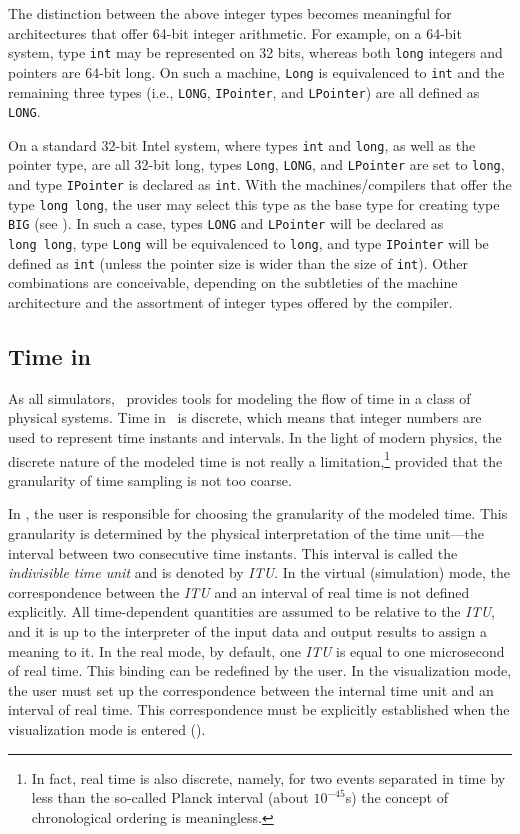 The distinction between the above integer types becomes meaningful for 
architectures that offer 64-bit integer arithmetic.
For example, on a 64-bit system, type {\tt int} may be
represented on 32 bits, whereas
both {\tt long} integers and pointers are 64-bit long.
On such a machine, {\tt Long} is equivalenced to {\tt int} and the remaining
three types (i.e., {\tt LONG}, {\tt IPointer}, and {\tt LPointer}) are all
defined as {\tt LONG}.

On a standard 32-bit Intel system,
where types {\tt int} and {\tt long}, as well as the pointer
type, are all 32-bit long, types {\tt Long}, {\tt LONG}, and {\tt LPointer}
are set to {\tt long}, and type {\tt IPointer} is declared as {\tt int}.
With the machines/compilers that offer the type {\tt long~long}, the user may select
this type as the base type for creating type {\tt BIG} (see ).
In such a case, types {\tt LONG} and {\tt LPointer} will be declared as
{\tt long~long}, type {\tt Long} will be equivalenced to {\tt long}, and type
{\tt IPointer} will be defined as {\tt int} (unless the pointer size is wider
than the size of {\tt int}).
Other combinations are conceivable, depending on the subtleties of the machine
architecture and the assortment of integer types offered by the compiler.

\subsection {Time in \smurph}
\label {rm_mp_ti}

As all simulators, \smurph\ provides tools for
modeling the flow of time in a class of physical systems.
Time in \smurph\ is discrete, which means that integer numbers are used
to represent time instants and intervals.
In the light of modern physics, the discrete nature of the modeled time
is not really a limitation,\footnote{In fact, real time is also
discrete, namely, for two events separated in time by less than the so-called
Planck interval (about $10^{-45}$s) the concept of chronological ordering
is meaningless.} provided that the granularity of time sampling is not
too coarse.

In \smurph, the user is responsible for choosing the granularity of the
modeled time.
This granularity is determined by the physical interpretation
of the time unit---the interval between two consecutive time instants.
This interval is called the {\em indivisible time unit\/} and is denoted
by {\em ITU}.
In the virtual (simulation) mode,
the correspondence between the {\em ITU\/} and an interval of real time
is not defined explicitly.
All time-dependent quantities are assumed to be relative to the {\em ITU},
and it is up to the interpreter of the input data and output results
to assign a meaning to it.
In the real mode, by default, one {\em ITU\/} is equal to one microsecond
of real time.
This binding can be redefined by the user.
In the visualization mode, the user must set up the correspondence between
the internal time unit and an interval of real time.
This correspondence must be explicitly established when the visualization
mode is entered ().

